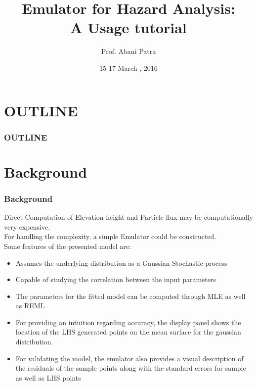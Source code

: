 \documentclass[10pt]{beamer}
\begin{document}
\title {\bfseries{\sc Emulator for Hazard Analysis:\\ A Usage tutorial}}
\author {Prof. Abani Patra}
\date{\small 15-17 March , 2016} 
\begin{frame}
\titlepage
\end{frame}
\section*{OUTLINE}
\begin{frame}
\frametitle{OUTLINE}  
\tableofcontents
\end{frame}

\section{Background}
\begin{frame}
\frametitle{Background}
Direct Computation of Elevation height and Particle flux may be computationally very expensive.\\
\vspace{1mm}
For handling the complexity, a simple Emulator could be constructed. \\
Some features of the presented model are:\\
\begin{itemize} 
    \item  Assumes the underlying distribution as a Gaussian Stochastic process
    \item Capable of studying the correlation between the input parameters
    \item The parameters for the fitted model can be computed through MLE as well as REML
    \item For providing an intuition regarding accuracy, the display panel shows the location of the LHS generated points on the mean surface for the gaussian distribution.
    \item For validating the model, the emulator also provides a visual description of the residuals of the sample points along with the standard errors for sample as well as LHS points

\end{itemize}
\end{frame}
\end{document}
